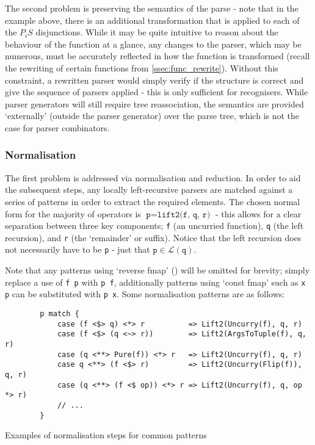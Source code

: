 The second problem is preserving the semantics of the parse - note that in the example above, there is an additional transformation that is applied to each of the $P_i S$ disjunctions.
While it may be quite intuitive to reason about the behaviour of the function at a glance, any changes to the parser, which may be numerous, must be accurately reflected in how the function is transformed (recall the rewriting of certain functions from \autoref{ssec:func_rewrite}).
Without this constraint, a rewritten parser would simply verify if the structure is correct and give the sequence of parsers applied - this is only sufficient for recognisers.
While parser generators will still require tree reassociation, the semantics are provided `externally' (outside the parser generator) over the parse tree, which is not the case for parser combinators.

\subsubsection*{Normalisation}
The first problem is addressed via normalisation and reduction.
In order to aid the subsequent steps, any locally left-recursive parsers are matched against a series of patterns in order to extract the required elements.
The chosen normal form for the majority of operators is $\texttt{p} = \texttt{lift2(f, q, r)}$ - this allows for a clear separation between three key components; \texttt{f} (an uncurried function), \texttt{q} (the left recursion), and \texttt{r} (the `remainder' or suffix).
Notice that the left recursion does not necessarily have to be \texttt{p} - just that $\texttt{p} \in \mathcal{L}(\texttt{q})$.

Note that any patterns using `reverse fmap' (\texttt{\pamf}) will be omitted for brevity; simply replace a use of \texttt{f \fmap p} with \texttt{p \pamf f}, additionally patterns using `const fmap' such as \texttt{x \constfmapl p} can be substituted with \texttt{p \constfmapr x}.
Some normalisation patterns are as follows:

\begin{capminted}
    \begin{verbatim}
        p match {
            case (f <$> q) <*> r          => Lift2(Uncurry(f), q, r)
            case (f <$> (q <~> r))        => Lift2(ArgsToTuple(f), q, r)
            case (q <**> Pure(f)) <*> r   => Lift2(Uncurry(f), q, r)
            case q <**> (f <$> r)         => Lift2(Uncurry(Flip(f)), q, r)
            case (q <**> (f <$ op)) <*> r => Lift2(Uncurry(f), q, op *> r)
            // ...
        }
    \end{verbatim}
    \vspace{-0.5\baselineskip}
    \caption{Examples of normalisation steps for common patterns}
    \label{lst:scala_normalisation}
\end{capminted}

